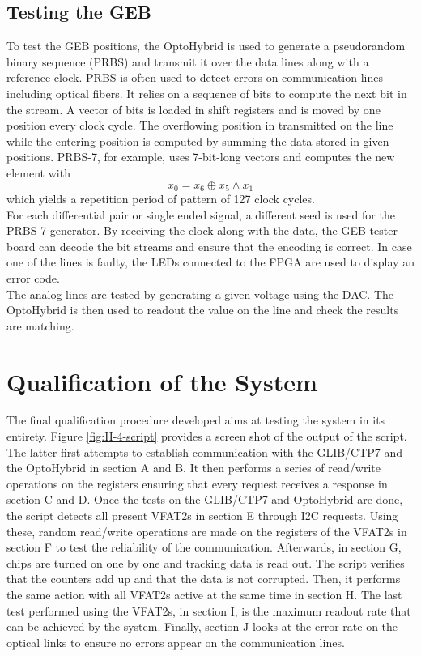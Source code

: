     \subsection{Testing the GEB}

      To test the GEB positions, the OptoHybrid is used to generate a pseudorandom binary sequence (PRBS) and transmit it over the data lines along with a reference clock. PRBS is often used to detect errors on communication lines including optical fibers. It relies on a sequence of bits to compute the next bit in the stream. A vector of bits is loaded in shift registers and is moved by one position every clock cycle. The overflowing position in transmitted on the line while the entering position is computed by summing the data stored in given positions. PRBS-7, for example, uses 7-bit-long vectors and computes the new element with
      \begin{equation}
        x_0 = x_6 \oplus x_5 \land x_1
      \end{equation}
      which yields a repetition period of pattern of 127 clock cycles. \\

      For each differential pair or single ended signal, a different seed is used for the PRBS-7 generator. By receiving the clock along with the data, the GEB tester board can decode the bit streams and ensure that the encoding is correct. In case one of the lines is faulty, the LEDs connected to the FPGA are used to display an error code. \\

      The analog lines are tested by generating a given voltage using the DAC. The OptoHybrid is then used to readout the value on the line and check the results are matching.

  \section{Qualification of the System}

    The final qualification procedure developed aims at testing the system in its entirety. Figure \ref{fig:II-4-script} provides a screen shot of the output of the script. The latter first attempts to establish communication with the GLIB/CTP7 and the OptoHybrid in section A and B. It then performs a series of read/write operations on the registers ensuring that every request receives a response in section C and D. Once the tests on the GLIB/CTP7 and OptoHybrid are done, the script detects all present VFAT2s in section E through I2C requests. Using these, random read/write operations are made on the registers of the VFAT2s in section F to test the reliability of the communication. Afterwards, in section G, chips are turned on one by one and tracking data is read out. The script verifies that the counters add up and that the data is not corrupted. Then, it performs the same action with all VFAT2s active at the same time in section H. The last test performed using the VFAT2s, in section I, is the maximum readout rate that can be achieved by the system. Finally, section J looks at the error rate on the optical links to ensure no errors appear on the communication lines. \\

